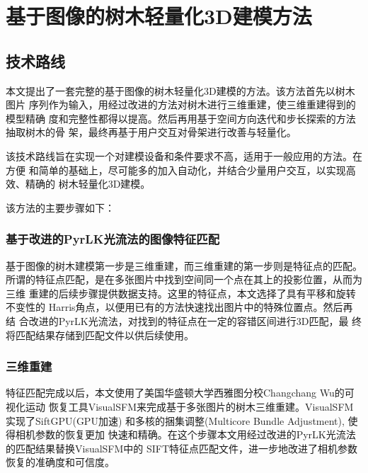 
\chapter{基于图像的树木轻量化3D建模方法}
\label{cha:techroute}

\section{技术路线}
\label{sec:techroute}
本文提出了一套完整的基于图像的树木轻量化3D建模的方法。该方法首先以树木图片
序列作为输入，用经过改进的方法对树木进行三维重建，使三维重建得到的模型精确
度和完整性都得以提高。然后再用基于空间方向迭代和步长探索的方法抽取树木的骨
架，最终再基于用户交互对骨架进行改善与轻量化。

该技术路线旨在实现一个对建模设备和条件要求不高，适用于一般应用的方法。在方便
和简单的基础上，尽可能多的加入自动化，并结合少量用户交互，以实现高效、精确的
树木轻量化3D建模。

该方法的主要步骤如下：

\subsection{基于改进的PyrLK光流法的图像特征匹配}
\label{subsec:match}
基于图像的树木建模第一步是三维重建，而三维重建的第一步则是特征点的匹配。
所谓的特征点匹配，是在多张图片中找到空间同一个点在其上的投影位置，从而为三维
重建的后续步骤提供数据支持。这里的特征点，本文选择了具有平移和旋转不变性的
Harris角点，以便用已有的方法快速找出图片中的特殊位置点。然后再结
合改进的PyrLK光流法，对找到的特征点在一定的容错区间进行3D匹配，最
终将匹配结果存储到匹配文件以供后续使用。

\subsection{三维重建}
\label{subsec:calibration}
特征匹配完成以后，本文使用了美国华盛顿大学西雅图分校Changchang Wu的可视化运动
恢复工具VisualSFM来完成基于多张图片的树木三维重建。VisualSFM实现了SiftGPU(GPU加速)
和多核的捆集调整(Multicore Bundle Adjustment), 使得相机参数的恢复更加
快速和精确。在这个步骤本文用经过改进的PyrLK光流法的匹配结果替换VisualSFM中的
SIFT特征点匹配文件，进一步地改进了相机参数恢复的准确度和可信度。


